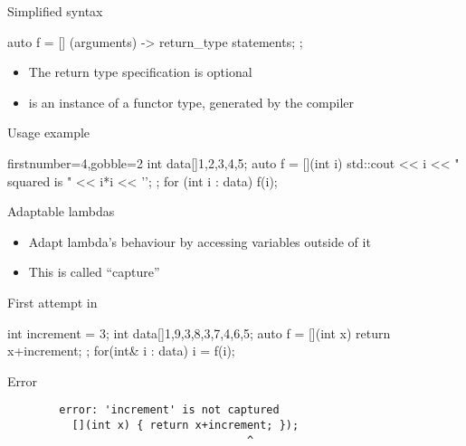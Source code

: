 \begin{frame}[fragile]
  \begin{block}{Simplified syntax}
    \begin{cppcode*}{}
      auto f = [] (arguments) -> return_type {
        statements;
      };
    \end{cppcode*}
    \begin{itemize}
    \item The return type specification is optional
    \item {} is an instance of a functor type, generated by the compiler
    \end{itemize}
  \end{block}
  \begin{exampleblock}{Usage example}
    \begin{cppcode*}{firstnumber=4,gobble=2}
      int data[]{1,2,3,4,5};
      auto f = [](int i) {
        std::cout << i << " squared is " << i*i << '\n';
      };
      for (int i : data) f(i);
    \end{cppcode*}
  \end{exampleblock}
\end{frame}


\begin{frame}[fragile]
  \begin{block}{Adaptable lambdas}
    \begin{itemize}
      \item Adapt lambda's behaviour by accessing variables outside of it
      \item This is called ``capture''
    \end{itemize}
  \end{block}
  \pause
  \begin{block}{First attempt in \cpp}
    \begin{cppcode}
      int increment = 3;
      int data[]{1,9,3,8,3,7,4,6,5};
      auto f = [](int x) { return x+increment; };
      for(int& i : data) i = f(i);
    \end{cppcode}
  \end{block}
  \pause
  \begin{alertblock}{Error}
    \begin{verbatim}
        error: 'increment' is not captured
          [](int x) { return x+increment; });
                                     ^
    \end{verbatim}
  \end{alertblock}
\end{frame}

